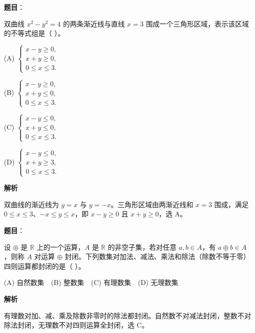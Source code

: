 \begin{answer}

\textbf{题目}：

双曲线 \(x^2-y^2=4\) 的两条渐近线与直线 \(x=3\) 围成一个三角形区域，表示该区域的不等式组是（ ）。

(A) \(\begin{cases}x-y\ge 0,\\x+y\ge 0,\\0\le x\le 3.\end{cases}\)

(B) \(\begin{cases}x-y\ge 0,\\x+y\le 0,\\0\le x\le 3.\end{cases}\)

(C) \(\begin{cases}x-y\le 0,\\x+y\le 0,\\0\le x\le 3.\end{cases}\)

(D) \(\begin{cases}x-y\le 0,\\x+y\ge 3,\\0\le x\le 3.\end{cases}\)

\textbf{解析}

双曲线的渐近线为 $y=x$ 与 $y=-x$。三角形区域由两渐近线和 $x=3$ 围成，满足 $0\le x\le3$、$-x\le y\le x$，即 $x-y\ge0$ 且 $x+y\ge0$，选 A。


\end{answer}
\begin{answer}

\textbf{题目}：

设 \(\oplus\) 是 \(\mathbb R\) 上的一个运算，\(A\) 是 \(\mathbb R\) 的非空子集，若对任意 \(a,b\in A\)，有 \(a\oplus b\in A\)，则称 \(A\) 对运算 \(\oplus\) 封闭。下列数集对加法、减法、乘法和除法（除数不等于零）四则运算都封闭的是（ ）。

(A) 自然数集　(B) 整数集　(C) 有理数集　(D) 无理数集

\textbf{解析}

有理数对加、减、乘及除数非零时的除法都封闭。自然数不对减法封闭，整数不对除法封闭，无理数不对四则运算全封闭，选 C。


\end{answer}
